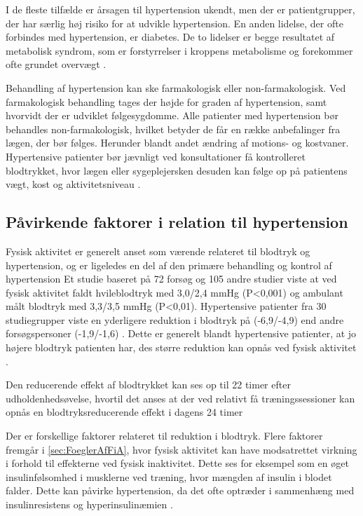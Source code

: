 I de fleste tilfælde er årsagen til hypertension ukendt, men der er patientgrupper, der har særlig høj risiko for at udvikle hypertension. En anden lidelse, der ofte forbindes med hypertension, er diabetes. De to lidelser er begge resultatet af metabolisk syndrom, som er forstyrrelser i kroppens metabolisme og forekommer ofte grundet overvægt \cite{cheung2012}.

Behandling af hypertension kan ske farmakologisk eller non-farmakologisk. Ved farmakologisk behandling tages der højde for graden af hypertension, samt hvorvidt der er udviklet følgesygdomme. Alle patienter med hypertension bør behandles non-farmakologisk, hvilket betyder de får en række anbefalinger fra lægen, der bør følges. Herunder blandt andet ændring af motions- og kostvaner. Hypertensive patienter bør jævnligt ved konsultationer få kontrolleret blodtrykket, hvor lægen eller sygeplejersken desuden kan følge op på patientens vægt, kost og aktivitetsniveau \cite{lodberg2016, bech2015}. 

\subsection{Påvirkende faktorer i relation til hypertension}

Fysisk aktivitet er generelt anset som værende relateret til blodtryk og hypertension, og er ligeledes en del af den primære behandling og kontrol af hypertension \citep{pescatello2004, fagard2006}
Et studie baseret på 72 forsøg og 105 andre studier viste at ved fysisk aktivitet faldt hvileblodtryk med 3,0/2,4 mmHg (P<0,001) og ambulant målt blodtryk med 3,3/3,5 mmHg (P<0,01). 
Hypertensive patienter fra 30 studiegrupper viste en yderligere reduktion i blodtryk på (-6,9/-4,9) end andre forsøgspersoner (-1,9/-1,6) \citep{fagard2006}. 
Dette er generelt blandt hypertensive patienter, at jo højere blodtryk patienten har, des større reduktion kan opnås ved fysisk aktivitet \citep{pedersen2011, pescatello2004}.

Den reducerende effekt af blodtrykket kan ses op til 22 timer efter udholdenhedsøvelse, hvortil det anses at der ved relativt få træningssessioner kan opnås en blodtryksreducerende effekt i dagens 24 timer \citep{pescatello2004} 

Der er forskellige faktorer relateret til reduktion i blodtryk. Flere faktorer fremgår i \autoref{sec:FoeglerAfFiA}, hvor fysisk aktivitet kan have modsatrettet virkning i forhold til effekterne ved fysisk inaktivitet. Dette ses for eksempel som en øget insulinfølsomhed i musklerne ved træning, hvor mængden af insulin i blodet falder. Dette kan påvirke hypertension, da det ofte optræder i sammenhæng med insulinresistens og hyperinsulinæmien \citep{pedersen2011}.

